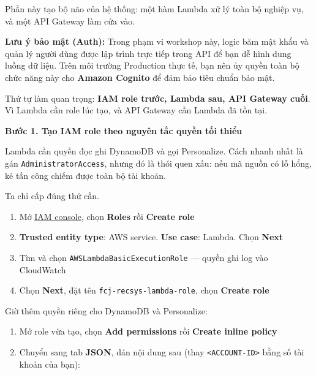 Phần này tạo bộ não của hệ thống: một hàm Lambda xử lý toàn bộ nghiệp
vụ, và một API Gateway làm cửa vào.

\textbf{Lưu ý bảo mật (Auth):} Trong phạm vi workshop này, logic băm mật
khẩu và quản lý người dùng được lập trình trực tiếp trong API để bạn dễ
hình dung luồng dữ liệu. Trên môi trường Production thực tế, bạn nên ủy
quyền toàn bộ chức năng này cho \textbf{Amazon Cognito} để đảm bảo tiêu
chuẩn bảo mật.

Thứ tự làm quan trọng: \textbf{IAM role trước, Lambda sau, API Gateway
cuối}. Vì Lambda cần role lúc tạo, và API Gateway cần Lambda đã tồn tại.

\vspace{0.5em}\noindent\textbf{Bước 1. Tạo IAM role theo nguyên tắc quyền tối
thiểu}\par

Lambda cần quyền đọc ghi DynamoDB và gọi Personalize. Cách nhanh nhất là
gán \texttt{AdministratorAccess}, nhưng đó là thói quen xấu: nếu mã
nguồn có lỗ hổng, kẻ tấn công chiếm được toàn bộ tài khoản.

Ta chỉ cấp đúng thứ cần.

\begin{enumerate}
\def\labelenumi{\arabic{enumi}.}
\tightlist
\item
  Mở \href{https://console.aws.amazon.com/iam/home\#/roles}{IAM
  console}, chọn \textbf{Roles} rồi \textbf{Create role}
\item
  \textbf{Trusted entity type}: AWS service. \textbf{Use case}: Lambda.
  Chọn \textbf{Next}
\item
  Tìm và chọn \texttt{AWSLambdaBasicExecutionRole} --- quyền ghi log vào
  CloudWatch
\item
  Chọn \textbf{Next}, đặt tên \texttt{fcj-recsys-lambda-role}, chọn
  \textbf{Create role}
\end{enumerate}

Giờ thêm quyền riêng cho DynamoDB và Personalize:

\begin{enumerate}
\def\labelenumi{\arabic{enumi}.}
\setcounter{enumi}{4}
\tightlist
\item
  Mở role vừa tạo, chọn \textbf{Add permissions} rồi \textbf{Create
  inline policy}
\item
  Chuyển sang tab \textbf{JSON}, dán nội dung sau (thay
  \texttt{\textless{}ACCOUNT-ID\textgreater{}} bằng số tài khoản của
  bạn):
\end{enumerate}

